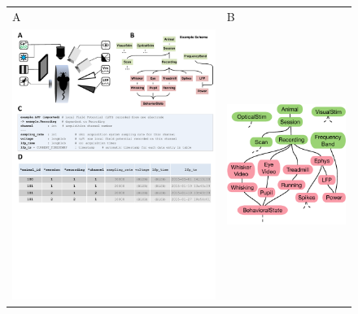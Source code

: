 \documentclass[10pt,letterpaper]{article}
\begin{document}
\begin{figure}
\begin{tabular}{p{}p{}}
{\sf \large A} & {\sf \large B}
\\
\vspace{0pt}\includegraphics{./figures/experiment.pdf} &
\vspace{0pt}\includegraphics{./figures/schema.pdf}
\\
\end{tabular}


\end{figure}
\end{document}
